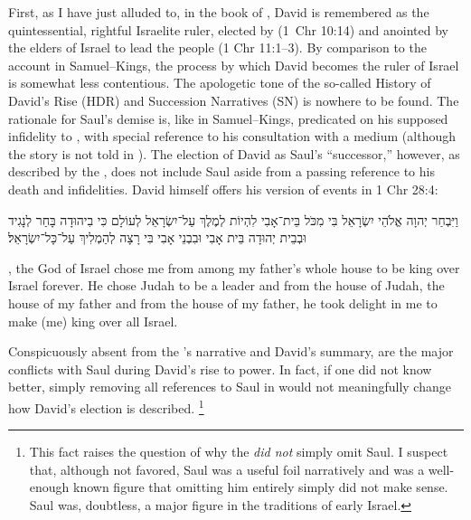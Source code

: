 First, as I have just alluded to, in the book of \chronicles, David is remembered as the quintessential, rightful Israelite ruler, elected by \yahweh (1~Chr 10:14) and anointed by the elders of Israel to lead the people (1 Chr 11:1--3). By comparison to the account in Samuel--Kings, the process by which David becomes the ruler of Israel is somewhat less contentious. The apologetic tone of the so-called History of David's Rise (HDR) and Succession Narratives (SN) is nowhere to be found. The rationale for Saul's demise is, like in Samuel--Kings, predicated on his supposed infidelity to \yahweh, with special reference to his consultation with a medium (although the story is not told in \chronicles). The election of David as Saul's ``successor,'' however, as described by the \chronicler, does not include Saul aside from a passing reference to his death and infidelities. David himself offers his version of events in 1 Chr 28:4:
\begin{hebrewtext}
    וַיִּבְחַר יְהוָה אֱלֹהֵי יִשְׂרָאֵל בִּי מִכֹּל בֵּית־אָבִי לִהְיוֹת לְמֶלֶךְ עַל־יִשְׂרָאֵל לְעוֹלָם כִּי בִיהוּדָה בָּחַר לְנָגִיד וּבְבֵית יְהוּדָה בֵּית אָבִי וּבִבְנֵי אָבִי בִּי רָצָה לְהַמְלִיךְ עַל־כָּל־יִשְׂרָאֵל׃ 
\end{hebrewtext}
\begin{translation}
    \yahweh, the God of Israel chose me from among my father's whole house to be king over Israel forever. He chose Judah to be a leader and from the house of Judah, the house of my father and from the house of my father, he took delight in me to make (me) king over all Israel.
\end{translation}
\noindent
Conspicuously absent from the \chronicler's narrative and David's summary, are the major conflicts with Saul during David's rise to power. In fact, if one did not know better, simply removing all references to Saul in \chronicles would not meaningfully change how David's election is described.%
    \footnote{This fact raises the question of why the \chronicler \emph{did not} simply omit Saul. I suspect that, although not favored, Saul was a useful foil narratively and was a well-enough known figure that omitting him entirely simply did not make sense. Saul was, doubtless, a major figure in the traditions of early Israel.}

